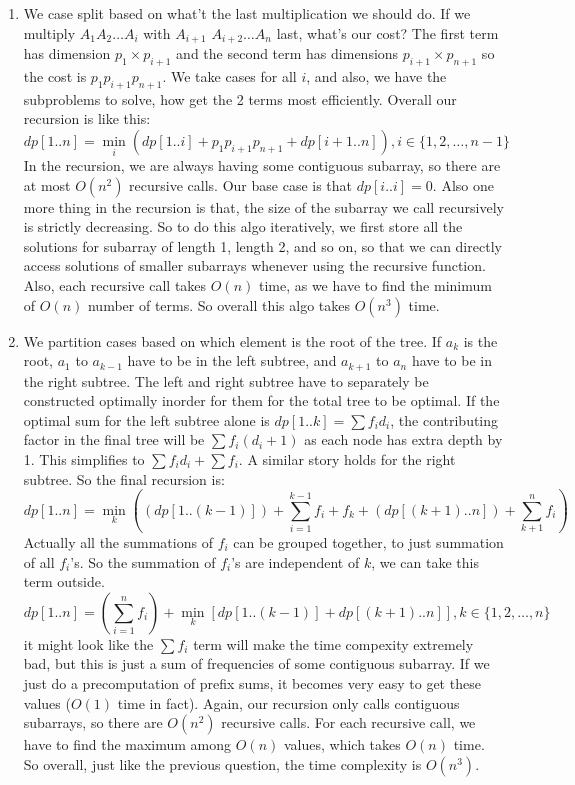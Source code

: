 \documentclass[12pt]{report}
\begin{document}
\begin{enumerate}[label=\textbf{\arabic*.}]
  \item We case split based on what't the last multiplication we should do. If we multiply $A_1 A_2 \dots A_i$ with $A_{i+1}$ $A_{i+2} \dots A_n$ last, what's our cost? The first term has dimension $p_1 
  \times p_{i+1}$ and the second term has dimensions $p_{i+1} \times p_{n+1}$ so the cost is $p_1 p_{i+1} p_{n+1}$. We take cases for all $i$, and also, we have the subproblems to solve, how get the 2
  terms most efficiently. Overall our recursion is like this:
  \[dp[1 .. n] = \min_i (dp[1 .. i] + p_1 p_{i+1} p_{n+1} + dp[i+1 .. n]), i \in \{1, 2, \dots, n-1\} \]
  In the recursion, we are always having some contiguous subarray, so there are at most $O(n^2)$ recursive calls. Our base case is that $dp[i .. i] = 0$. Also one more thing in the recursion is that, the 
  size of the subarray we call recursively is strictly decreasing. So to do this algo iteratively, we first store all the solutions for subarray of length 1, length 2, and so on, so that we can directly 
  access solutions of smaller subarrays whenever using the recursive function. Also, each recursive call takes $O(n)$ time, as we have to find the minimum of $O(n)$ number of terms.
  So overall this algo takes $O(n^3)$ time.

  \item We partition cases based on which element is the root of the tree. If $a_k$ is the root, $a_1$ to $a_{k-1}$ have to be in the left subtree, and $a_{k+1}$ to $a_n$ have to be in the right subtree.
  The left and right subtree have to separately be constructed optimally inorder for them for the total tree to be optimal. If the optimal sum for the left subtree alone is $dp[1..k] = \sum f_i d_i$, the 
  contributing factor in the final tree will be $\sum f_i (d_i + 1)$ as each node has extra depth by 1. This simplifies to $\sum f_i d_i + \sum f_i$. A similar story holds for the right subtree. So the
  final recursion is:
  \[dp[1 .. n] = \min_k \left((dp[1 .. (k-1)]) + \sum_{i=1}^{k-1} f_i + f_k + (dp[(k+1) .. n]) + \sum_{k+1}^{n} f_i \right) \] 
  Actually all the summations of $f_i$ can be grouped together, to just summation of all $f_i$'s. So the summation of $f_i$'s are independent of $k$, we can take this term outside.
  \[dp[1 .. n] = \left(\sum_{i=1}^n f_i \right) + \min_k [dp[1 .. (k-1)] + dp[(k+1) .. n]], k \in \{1, 2, \dots, n\} \] 
  it might look like the $\sum f_i$ term will make the time compexity extremely bad, but this is just a sum of frequencies of some contiguous subarray. If we just do a precomputation of prefix sums, it
  becomes very easy to get these values ($O(1)$ time in fact). Again, our recursion only calls contiguous subarrays, so there are $O(n^2)$ recursive calls. For each recursive call, we have to find the maximum
  among $O(n)$ values, which takes $O(n)$ time. So overall, just like the previous question, the time complexity is $O(n^3)$.


\end{enumerate}
\end{document}
